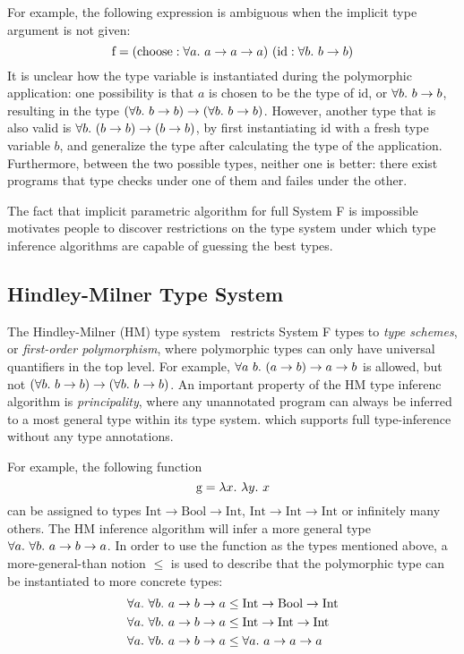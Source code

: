 For example, the following expression is ambiguous
when the implicit type argument is not given:
$$\text{f} = (\text{choose} : \all a \to a \to a)~(\text{id} : \all[b] b \to b)$$
It is unclear how the type variable is instantiated during the polymorphic application:
one possibility is that $a$ is chosen to be the type of $\text{id}$, or $\all[b] b \to b$,
resulting in the type $(\all[b] b \to b) \to (\all[b] b \to b)$.
However, another type that is also valid is $\all[b] (b \to b) \to (b \to b)$,
by first instantiating $\text{id}$ with a fresh type variable $b$,
and generalize the type after calculating the type of the application.
Furthermore, between the two possible types, neither one is better:
there exist programs that type checks under one of them and failes under the other.

The fact that implicit parametric algorithm for full System F is impossible
motivates people to discover restrictions on the type system
under which type inference algorithms are capable of guessing the best types.


\subsection{Hindley-Milner Type System}

The Hindley-Milner (HM) type system~\cite{hindley1969principal,milner1978theory,damas1982principal} restricts System F types to \emph{type schemes},
or \emph{first-order polymorphism},
where polymorphic types can only have universal quantifiers in the top level.
For example, $\all[a~b] (a \to b) \to a \to b$ is allowed,
but not $(\all[b] b \to b) \to (\all[b] b \to b)$.
An important property of the HM type inferenc algorithm is \emph{principality},
where any unannotated program can always be inferred to a most general type within its type system.
which supports full type-inference without any type annotations.

For example, the following function
$$\text{g} = \lam[x]{\lam[y] x}$$
can be assigned to types $\text{Int} \to \text{Bool} \to \text{Int}$,
$\text{Int} \to \text{Int} \to \text{Int}$ or infinitely many others.
The HM inference algorithm will infer a more general type $\all[a]{\all[b] a \to b \to a}$.
In order to use the function as the types mentioned above,
a more-general-than notion $\le$ is used to describe that
the polymorphic type can be instantiated to more concrete types:
$$\begin{aligned}
  \all[a]{\all[b] a \to b \to a} &\le \text{Int} \to \text{Bool} \to \text{Int}\\
  \all[a]{\all[b] a \to b \to a} &\le \text{Int} \to \text{Int} \to \text{Int}\\
  \all[a]{\all[b] a \to b \to a} &\le \all a \to a \to a\\
\end{aligned}$$


